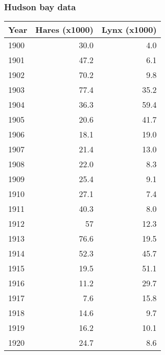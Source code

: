 \documentclass{beamer}
\begin{document}
\begin{frame}
\frametitle{Hudson bay data}

\begin{block}{}


{\footnotesize
\begin{tabular}{lrr}
\hline
\multicolumn{1}{c}{ Year } & \multicolumn{1}{c}{ Hares (x1000) } & \multicolumn{1}{c}{ Lynx (x1000) } \\
\hline
1900 & 30.0          & 4.0          \\
1901 & 47.2          & 6.1          \\
1902 & 70.2          & 9.8          \\
1903 & 77.4          & 35.2         \\
1904 & 36.3          & 59.4         \\
1905 & 20.6          & 41.7         \\
1906 & 18.1          & 19.0         \\
1907 & 21.4          & 13.0         \\
1908 & 22.0          & 8.3          \\
1909 & 25.4          & 9.1          \\
1910 & 27.1          & 7.4          \\
1911 & 40.3          & 8.0          \\
1912 & 57            & 12.3         \\
1913 & 76.6          & 19.5         \\
1914 & 52.3          & 45.7         \\
1915 & 19.5          & 51.1         \\
1916 & 11.2          & 29.7         \\
1917 & 7.6           & 15.8         \\
1918 & 14.6          & 9.7          \\
1919 & 16.2          & 10.1         \\
1920 & 24.7          & 8.6          \\
\hline
\end{tabular}
}

\noindent
\end{block}
\end{frame}
\end{document}
